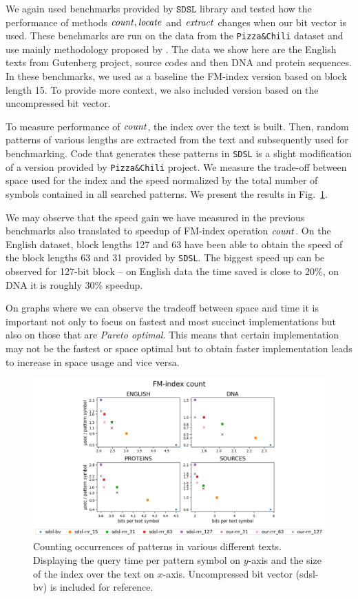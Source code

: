 We again used benchmarks provided by $\texttt{SDSL}$ library and tested how the performance
of methods $\mathit{count}, \mathit{locate}$ and $\mathit{extract}$ changes when our bit vector is used. These
benchmarks are run on the data from the \texttt{Pizza\&Chili} dataset and use mainly methodology
proposed by \cite{ferragina2009compressed}. The data we show here are the English texts from
Gutenberg project, source codes and then DNA and protein sequences. In these benchmarks, we used
as a baseline the FM-index version based on block length 15. To provide more context, we also included
version based on the uncompressed bit vector.

To measure performance of $\mathit{count}$, the index over the text is built. Then, random patterns of
various lengths are extracted from the text and subsequently used for benchmarking. Code
that generates these patterns in \texttt{SDSL} is a slight modification of a version provided
by \texttt{Pizza\&Chili} project. We measure the trade-off between space used for the index and the
speed normalized by the total number of symbols contained in all searched patterns. We present the
results in Fig.~\ref{obr:benchmark_sdsl_count}.

We may observe that the speed gain we have measured in the previous benchmarks also translated
to speedup of FM-index operation $\mathit{count}$. On the English dataset, block lengths 127 and 63 have
been able to obtain the speed of the block lengths 63 and 31 provided by \texttt{SDSL}. The biggest
speed up can be observed for 127-bit block -- on English data the time saved is close to 20\%, on
DNA it is roughly 30\% speedup.

On graphs where we can observe the tradeoff between space and time it is important not only to
focus on fastest and most succinct implementations but also on those that are \textit{Pareto optimal}.
This means that certain implementation may not be the fastest or space optimal but to obtain faster
implementation leads to increase in space usage and vice versa.

\begin{figure}
	\centerline{
		\includegraphics[width=\textwidth, height=0.4\textheight]{images/vysledky_sdsl_count}
	}
	\caption[TODO]{Counting occurrences of patterns in various different texts. Displaying
	the query time per pattern symbol on $y$-axis and the size of the index over the
	text on $x$-axis. Uncompressed bit vector (sdsl-bv) is included for reference. 
	}
	\label{obr:benchmark_sdsl_count}
\end{figure}

